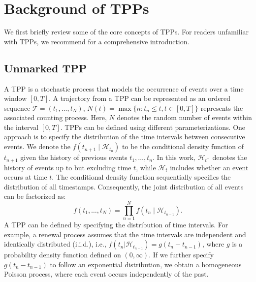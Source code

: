 \documentclass[10pt]{article} %
\begin{document}
\section{Background of TPPs}
\label{sec2}

We first briefly review some of the core concepts of TPPs. For readers unfamiliar with TPPs, we recommend \citet{rasmussen2018lecture} for a comprehensive introduction. 

\subsection{Unmarked TPP}

A TPP is a stochastic process that models the occurrence of events over a time window \([0, T]\). A trajectory from a TPP can be represented as an ordered sequence $\mathcal{T} = (t_1, \ldots, t_{N})$, $N(t) = \max\{n : t_n \leq t, t \in [0, T]\}$ represents the associated counting process. Here, \(N\) denotes the random number of events within the interval \([0, T]\). TPPs can be defined using different parameterizations. One approach is to specify the distribution of the time intervals between consecutive events. We denote the $f(t_{n+1} \mid \mathcal{H}_{t_n})$ to be the conditional density function of $t_{n+1}$ given the history of previous events $t_1, \ldots, t_n$. In this work, $\mathcal{H}_{t^-}$ denotes the history of events up to but excluding time $t$, while $\mathcal{H}_{t}$ includes whether an event occurs at time $t$. 
The conditional density function sequentially specifies the distribution of all timestamps. Consequently, the joint distribution of all events can be factorized as: 
\begin{equation}
    f(t_1, \ldots, t_{N})=\prod_{n=1}^{N} f(t_n\mid \mathcal{H}_{t_{n-1}}). 
\label{unmark_likelihood}
\end{equation}
A TPP can be defined by specifying the distribution of time intervals. For example, a renewal process assumes that the time intervals are independent and identically distributed (i.i.d.), i.e., $f(t_n | \mathcal{H}_{t_{n-1}}) = g(t_n - t_{n-1})$, where \( g \) is a probability density function defined on \((0, \infty)\). If we further specify \( g(t_n - t_{n-1}) \) to follow an exponential distribution, we obtain a homogeneous Poisson process, where each event occurs independently of the past. 
\end{document}
